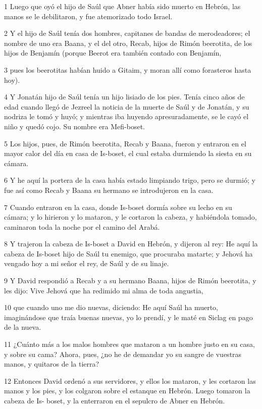 \par 1 Luego que oyó el hijo de Saúl que Abner había sido muerto en Hebrón, las manos se le debilitaron, y fue atemorizado todo Israel.
\par 2 Y el hijo de Saúl tenía dos hombres, capitanes de bandas de merodeadores; el nombre de uno era Baana, y el del otro, Recab, hijos de Rimón beerotita, de los hijos de Benjamín (porque Beerot era también contado con Benjamín,
\par 3 pues los beerotitas habían huido a Gitaim, y moran allí como forasteros hasta hoy).
\par 4 Y Jonatán hijo de Saúl tenía un hijo lisiado de los pies. Tenía cinco años de edad cuando llegó de Jezreel la noticia de la muerte de Saúl y de Jonatán, y su nodriza le tomó y huyó; y mientras iba huyendo apresuradamente, se le cayó el niño y quedó cojo. Su nombre era Mefi-boset.
\par 5 Los hijos, pues, de Rimón beerotita, Recab y Baana, fueron y entraron en el mayor calor del día en casa de Is-boset, el cual estaba durmiendo la siesta en su cámara.
\par 6 Y he aquí la portera de la casa había estado limpiando trigo, pero se durmió; y fue así como Recab y Baana su hermano se introdujeron en la casa.
\par 7 Cuando entraron en la casa, donde Is-boset dormía sobre su lecho en su cámara; y lo hirieron y lo mataron, y le cortaron la cabeza, y habiéndola tomado, caminaron toda la noche por el camino del Arabá.
\par 8 Y trajeron la cabeza de Is-boset a David en Hebrón, y dijeron al rey: He aquí la cabeza de Is-boset hijo de Saúl tu enemigo, que procuraba matarte; y Jehová ha vengado hoy a mi señor el rey, de Saúl y de su linaje.
\par 9 Y David respondió a Recab y a su hermano Baana, hijos de Rimón beerotita, y les dijo: Vive Jehová que ha redimido mi alma de toda angustia,
\par 10 que cuando uno me dio nuevas, diciendo: He aquí Saúl ha muerto, imaginándose que traía buenas nuevas, yo lo prendí, y le maté en Siclag en pago de la nueva. 
\par 11 ¿Cuánto más a los malos hombres que mataron a un hombre justo en su casa, y sobre su cama? Ahora, pues, ¿no he de demandar yo su sangre de vuestras manos, y quitaros de la tierra? 
\par 12 Entonces David ordenó a sus servidores, y ellos los mataron, y les cortaron las manos y los pies, y los colgaron sobre el estanque en Hebrón. Luego tomaron la cabeza de Is- boset, y la enterraron en el sepulcro de Abner en Hebrón.

